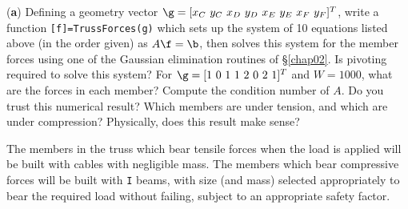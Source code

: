 \begin{exercise}
\noindent ({\bf a}) Defining a geometry vector
$\g=[x_C\ y_C\ x_D\ y_D\ x_E\ y_E\ x_F\ y_F]^T$,
write a function {\tt [f]=TrussForces(g)} which
sets up the system of 10 equations listed above (in the order given)
as $A\f = \b$, then solves this system for the member
forces using one of the Gaussian elimination routines of \S \ref{chap02}.  Is pivoting required to solve this system?
For $\g=[1\ 0\ 1\ 1\ 2\ 0\ 2\ 1]^T$ and
$W=1000$, what are the forces in each member?  Compute the
condition number of $A$.  Do you trust this numerical result?  Which
members are under tension, and which are under compression?
Physically, does this result make sense?
\end{exercise}

The members in the truss which bear
tensile forces when the load is applied will be built with cables with
negligible mass.  The members which bear compressive forces will be built with {\tt I} beams, with size (and
mass) selected appropriately to bear the required load without failing,
subject to an appropriate safety factor. \vskip0.1in

\def\TE{TE}
\def\KE{KE}
\def\PE{PE}
\def\DE{DE}
\def\alphad{{\boldsymbol{\alpha}}}
\def\thetad{{\pmb{\theta}}}
\def\xid{{\boldsymbol{\xi}}}

